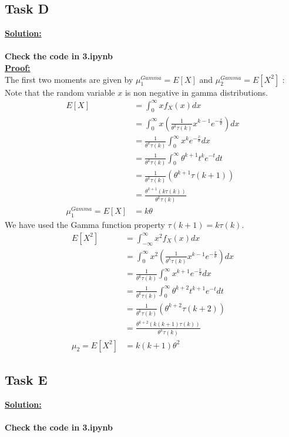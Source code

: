 \documentclass[12pt]{article}
\begin{document}
\subsection{Task D}
\textbf{\underline{Solution:}}\\
\\
\textbf{Check the code in 3.ipynb}
\\
\textbf{\underline{Proof: }}
\\
The first two moments are given by $\mu_1^{Gamma} = E[X]$ and $\mu_2^{Gamma} = E[X^2]$ :\\
Note that the random variable $x$ is non negative in gamma distributions.
\begin{equation}
\begin{split}
    E[X] &= \int_{0}^{\infty}xf_X(x)dx\\
         &= \int_{0}^{\infty}x(\frac{1}{\theta^k\tau(k)}x^{k-1}e^{-\frac{x}{\theta}})dx\\
         &= \frac{1}{\theta^k\tau(k)}\int_{0}^{\infty}x^{k}e^{-\frac{x}{\theta}}dx\\ 
         &= \frac{1}{\theta^k\tau(k)}\int_{0}^{\infty}{\theta}^{k+1}t^{k}e^{-t}dt\\
         &= \frac{1}{\theta^k\tau(k)}(\theta^{k+1}\tau(k+1))\\
          &= \frac{\theta^{k+1}(k\tau(k))}{\theta^k\tau(k)}\\
         \mu_1^{Gamma} = E[X] &= k\theta
\end{split}
\end{equation}
We have used the Gamma function property $\tau(k+1) = k\tau(k)$.
\begin{equation}
\begin{split}
    E[X^2] &= \int_{-\infty}^{\infty}x^2f_X(x)dx\\
         &= \int_{0}^{\infty}x^2(\frac{1}{\theta^k\tau(k)}x^{k-1}e^{-\frac{x}{\theta}})dx\\
         &= \frac{1}{\theta^k\tau(k)}\int_{0}^{\infty}x^{k+1}e^{-\frac{x}{\theta}}dx\\ 
         &= \frac{1}{\theta^k\tau(k)}\int_{0}^{\infty}{\theta}^{k+2}t^{k+1}e^{-t}dt\\
         &= \frac{1}{\theta^k\tau(k)}(\theta^{k+2}\tau(k+2))\\
          &= \frac{\theta^{k+2}(k(k+1)\tau(k))}{\theta^k\tau(k)}\\
         \mu_2 = E[X^2] &= k(k+1)\theta^2
\end{split}
\end{equation}
\subsection{Task E}
\textbf{\underline{Solution:}}\\
\\
\textbf{Check the code in 3.ipynb}
\end{document}
